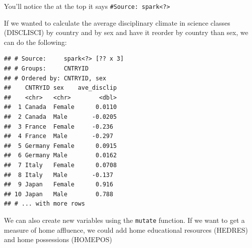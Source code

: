 \documentclass[]{book}
\newenvironment{Shaded}{\begin{snugshade}}{\end{snugshade}}
\newcommand{\DataTypeTok}[1]{\textcolor[rgb]{0.13,0.29,0.53}{#1}}
\newcommand{\KeywordTok}[1]{\textcolor[rgb]{0.13,0.29,0.53}{\textbf{#1}}}
\newcommand{\NormalTok}[1]{#1}
\newcommand{\OperatorTok}[1]{\textcolor[rgb]{0.81,0.36,0.00}{\textbf{#1}}}
\newcommand{\OtherTok}[1]{\textcolor[rgb]{0.56,0.35,0.01}{#1}}
\newcommand{\StringTok}[1]{\textcolor[rgb]{0.31,0.60,0.02}{#1}}
\begin{document}
You'll notice the at the top it says \texttt{\#Source:\ spark\textless{}?\textgreater{}}

If we wanted to calculate the average disciplinary climate in science classes (DISCLISCI) by country and by sex and have it reorder by country than sex, we can do the following:

\begin{Shaded}
\end{Shaded}

\begin{verbatim}
## # Source:     spark<?> [?? x 3]
## # Groups:     CNTRYID
## # Ordered by: CNTRYID, sex
##    CNTRYID sex    ave_disclip
##    <chr>   <chr>        <dbl>
##  1 Canada  Female      0.0110
##  2 Canada  Male       -0.0205
##  3 France  Female     -0.236 
##  4 France  Male       -0.297 
##  5 Germany Female      0.0915
##  6 Germany Male        0.0162
##  7 Italy   Female      0.0708
##  8 Italy   Male       -0.137 
##  9 Japan   Female      0.916 
## 10 Japan   Male        0.788 
## # ... with more rows
\end{verbatim}

We can also create new variables using the \texttt{mutate} function. If we want to get a measure of home affluence, we could add home educational resources (HEDRES) and home possessions (HOMEPOS)

\begin{Shaded}
\end{Shaded}
\end{document}
